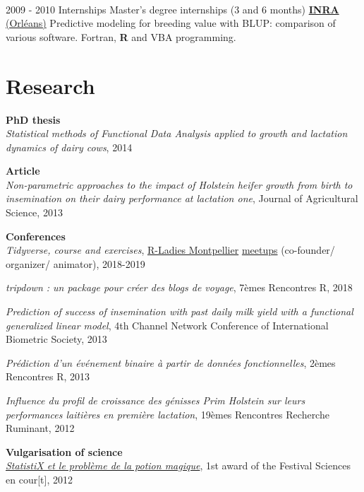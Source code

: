 \documentclass[letterpaper]{twentysecondcv} %
\begin{document}
\begin{twenty}
{        }
     \\
     \twentyitem
   		{2009 - 2010}
		{Internships}
        {Master's degree internships \textnormal{(3 and 6 months)}}
        {\href{https://www6.val-de-loire.inra.fr/biofora}{\textbf{INRA} (Orléans)}}
        {}
        {Predictive modeling for breeding value with BLUP: comparison of various software. Fortran, \textbf{R} and VBA programming.
    	}
        
\end{twenty}

\vspace{5mm} 

\section{Research}
\textbf{PhD thesis} \\ 
\textit{Statistical methods of Functional Data Analysis applied to growth and lactation dynamics of dairy cows}, 2014

\textbf{Article} \\ 
\textit{Non-parametric approaches to the impact of Holstein heifer growth from birth to insemination on their dairy performance at lactation one}, Journal of Agricultural Science,  2013 

\textbf{Conferences} \\ 
\textit{Tidyverse, course and exercises}, \href{https://twitter.com/RLadiesMontpel}{R-Ladies Montpellier} \href{https://www.meetup.com/fr-FR/rladies-montpellier/}{meetups} (co-founder/ organizer/ animator), 2018-2019

\textit{tripdown : un package pour créer des blogs de voyage}, 7èmes Rencontres R, 2018

\textit{Prediction of success of insemination with past daily milk yield with a functional generalized linear model}, 4th Channel Network Conference of International Biometric Society, 2013

\textit{Prédiction d'un événement binaire à partir de données fonctionnelles}, 2èmes Rencontres R, 2013

\textit{Influence du profil de croissance des génisses Prim Holstein sur leurs performances laitières en première
lactation}, 19èmes Rencontres Recherche Ruminant, 2012 

\textbf{Vulgarisation of science}\\
\href{https://www.youtube.com/watch?v=QAT0F__A258}{\textit{StatistiX et le problème de la potion magique}}, 1st award of the Festival Sciences en cour[t], 2012
\end{document}
